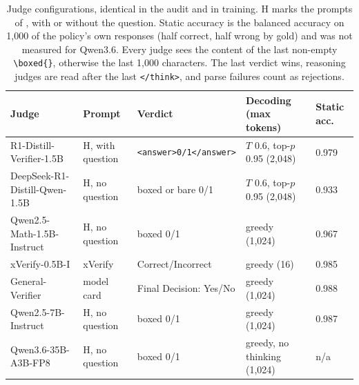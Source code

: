 \documentclass[11pt]{article}
\begin{document}
\begin{table}[t]
  \centering
  \footnotesize
  \begin{tabular}{@{}lllll@{}}
    \toprule
    Judge & Prompt & Verdict & Decoding (max tokens) & Static acc. \\
    \midrule
    R1-Distill-Verifier-1.5B & H, with question & \texttt{<answer>0/1</answer>} & $T$ 0.6, top-$p$ 0.95 (2,048) & 0.979 \\
    DeepSeek-R1-Distill-Qwen-1.5B & H, no question & boxed or bare 0/1 & $T$ 0.6, top-$p$ 0.95 (2,048) & 0.933 \\
    Qwen2.5-Math-1.5B-Instruct & H, no question & boxed 0/1 & greedy (1,024) & 0.967 \\
    xVerify-0.5B-I & xVerify & Correct/Incorrect & greedy (16) & 0.985 \\
    General-Verifier & model card & Final Decision: Yes/No & greedy (1,024) & 0.988 \\
    Qwen2.5-7B-Instruct & H, no question & boxed 0/1 & greedy (1,024) & 0.987 \\
    Qwen3.6-35B-A3B-FP8 & H, no question & boxed 0/1 & greedy, no thinking (1,024) & n/a \\
    \bottomrule
  \end{tabular}
  \caption{Judge configurations, identical in the audit and in training. H marks the prompts of
  \citet{huang2025accuracy}, with or without the question. Static accuracy is the balanced accuracy on
  1,000 of the policy's own responses (half correct, half wrong by gold) and was not measured for
  Qwen3.6. Every judge sees the content of the last non-empty \texttt{\textbackslash{}boxed\{\}}, otherwise the
  last 1,000 characters. The last verdict wins, reasoning judges are read after the last \texttt{</think>}, and parse
  failures count as rejections.}
  \label{tab:judges}
\end{table}
\end{document}

